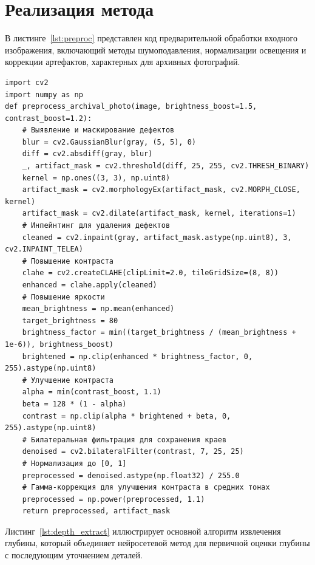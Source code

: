 \section{Реализация метода}

В листинге~\ref{lst:preproc} представлен код предварительной обработки входного изображения, включающий методы шумоподавления, нормализации освещения и коррекции артефактов, характерных для архивных фотографий.

\begin{center}
    \begin{lstlisting}[label=lst:preproc,caption=Предварительная обработка изображения,xrightmargin=8pt,xleftmargin=17pt,xleftmargin=17pt]
import cv2
import numpy as np
def preprocess_archival_photo(image, brightness_boost=1.5, contrast_boost=1.2):
    # Выявление и маскирование дефектов
    blur = cv2.GaussianBlur(gray, (5, 5), 0)
    diff = cv2.absdiff(gray, blur)
    _, artifact_mask = cv2.threshold(diff, 25, 255, cv2.THRESH_BINARY)
    kernel = np.ones((3, 3), np.uint8)
    artifact_mask = cv2.morphologyEx(artifact_mask, cv2.MORPH_CLOSE, kernel)
    artifact_mask = cv2.dilate(artifact_mask, kernel, iterations=1)
    # Инпейнтинг для удаления дефектов
    cleaned = cv2.inpaint(gray, artifact_mask.astype(np.uint8), 3, cv2.INPAINT_TELEA)
    # Повышение контраста
    clahe = cv2.createCLAHE(clipLimit=2.0, tileGridSize=(8, 8))
    enhanced = clahe.apply(cleaned)
    # Повышение яркости
    mean_brightness = np.mean(enhanced)
    target_brightness = 80
    brightness_factor = min((target_brightness / (mean_brightness + 1e-6)), brightness_boost)
    brightened = np.clip(enhanced * brightness_factor, 0, 255).astype(np.uint8)
    # Улучшение контраста
    alpha = min(contrast_boost, 1.1)
    beta = 128 * (1 - alpha)
    contrast = np.clip(alpha * brightened + beta, 0, 255).astype(np.uint8)
    # Билатеральная фильтрация для сохранения краев
    denoised = cv2.bilateralFilter(contrast, 7, 25, 25)
    # Нормализация до [0, 1]
    preprocessed = denoised.astype(np.float32) / 255.0
    # Гамма-коррекция для улучшения контраста в средних тонах
    preprocessed = np.power(preprocessed, 1.1)
    return preprocessed, artifact_mask
    \end{lstlisting}
\end{center}

Листинг~\ref{lst:depth_extract} иллюстрирует основной алгоритм извлечения глубины, который объединяет нейросетевой метод для первичной оценки глубины с последующим уточнением деталей.

